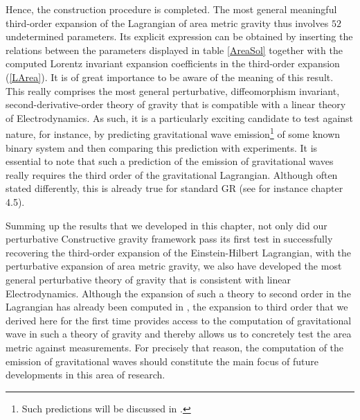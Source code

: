 Hence, the construction procedure is completed. The most general meaningful third-order expansion of the Lagrangian of area metric gravity thus involves $52$ undetermined parameters. Its explicit expression can be obtained by inserting the relations between the parameters displayed in table \ref{AreaSol} together with the computed Lorentz invariant expansion coefficients in the third-order expansion (\ref{LArea}). It is of great importance to be aware of the meaning of this result. This really comprises the most general perturbative, diffeomorphism invariant, second-derivative-order theory of gravity that is compatible with a linear theory of Electrodynamics. As such, it is a particularly exciting candidate to test against nature, for instance, by predicting gravitational wave emission\footnote{Such predictions will be discussed in \cite{NilsPHD}.} of some known binary system and then comparing this prediction with experiments. It is essential to note that such a prediction of the emission of gravitational waves really requires the third order of the gravitational Lagrangian. Although often stated differently, this is already true for standard GR (see for instance \cite{1984grra.book.....S} chapter 4.5).

Summing up the results that we developed in this chapter, not only did our perturbative Constructive gravity framework pass its first test in successfully recovering the third-order expansion of the Einstein-Hilbert Lagrangian, with the perturbative expansion of area metric gravity, we also have developed the most general perturbative theory of gravity that is consistent with linear Electrodynamics. Although the expansion of such a theory to second order in the Lagrangian has already been computed in \cite{2017arXiv170803870S}, the expansion to third order that we derived here for the first time provides access to the computation of gravitational wave in such a theory of gravity and thereby allows us to concretely test the area metric against measurements. For precisely that reason, the computation of the emission of gravitational waves should constitute the main focus of future developments in this area of research. 